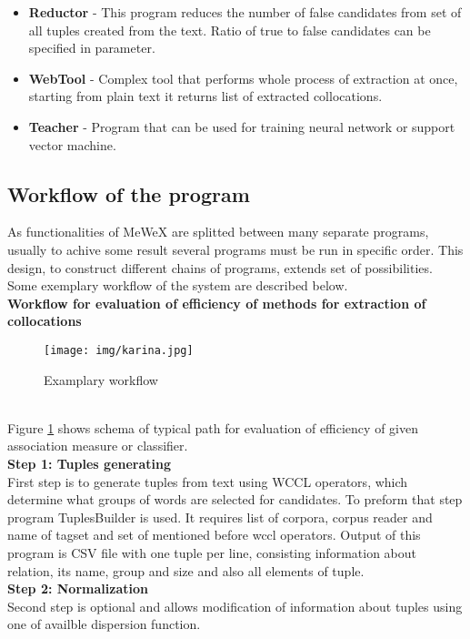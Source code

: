 \begin{itemize}
    \item \textbf{Reductor} - This program reduces the number of false candidates from set of all tuples created from the text. 
    Ratio of true to false candidates can be specified in parameter.
 
    \item \textbf{WebTool} - Complex tool that performs whole process of extraction at once, starting from plain text 
    it returns list of extracted collocations.
 
    \item \textbf{Teacher} - Program that can be used for training neural network or support vector machine.
 
    
\end{itemize}

\subsection{Workflow of the program} \label{mewex_workflow}
As functionalities of MeWeX are splitted between many separate programs, usually to achive some result several programs must be run in specific order. 
This design, to construct different chains of programs, extends set of possibilities. Some exemplary workflow of the system are described below. 
\\ \textbf{Workflow for evaluation of efficiency of methods for extraction of collocations}
\begin{figure}[ht]
	\centering
	\texttt{[image: img/karina.jpg]}
	\caption{Examplary workflow}
	\label{img_workflow1}
\end{figure}
\\ Figure \ref{img_workflow1} shows schema of typical path for evaluation of efficiency of given association measure or classifier.
\\ \textbf{Step 1: Tuples generating}\\
First step is to generate tuples from text using WCCL operators, which determine what groups of words are selected for candidates. 
To preform that step program TuplesBuilder is used. It requires list of corpora, corpus reader and name of tagset and 
set of mentioned before wccl operators. Output of this program is CSV file with one tuple per line, consisting information about relation, 
its name, group and size and also all elements of tuple.
\\ \textbf{Step 2: Normalization}\\
Second step is optional and allows modification of information about tuples using one of availble dispersion function. 
